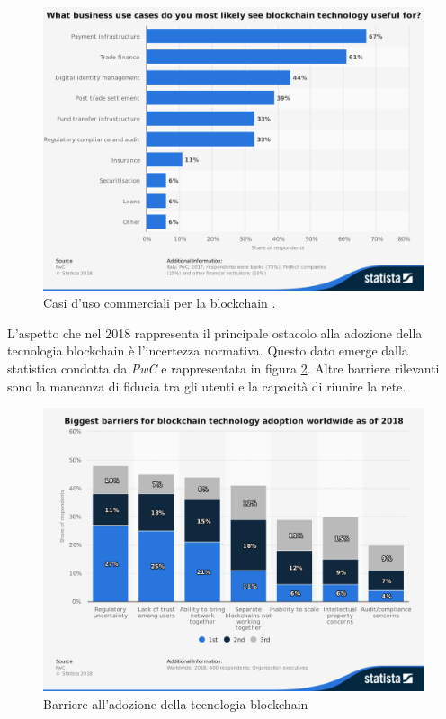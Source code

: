 \begin{figure}[H]
	\centering
	\includegraphics[width=.6\linewidth]{images/chap_intro/use-cases-among-businesses.pdf}
	\caption{Casi d'uso commerciali per la blockchain
		\cite{use-cases-among-businesses}.}
	\label{fig:use-cases-among-businesses}
\end{figure}


L'aspetto che nel 2018 rappresenta il principale ostacolo alla adozione della tecnologia blockchain
è l'incertezza normativa. Questo dato emerge dalla statistica condotta da
\textit{PwC} \cite{barriers-worldwide}
e rappresentata in figura \ref{fig:barriers-worldwide}.
Altre barriere rilevanti sono la mancanza di fiducia tra gli utenti e la capacità di riunire la rete.


\begin{figure}[H]
	\centering
	\includegraphics[width=.6\linewidth]{images/chap_intro/barriers-worldwide.pdf}
	\caption{Barriere all'adozione della tecnologia blockchain
		\cite{barriers-worldwide}}
	\label{fig:barriers-worldwide}
\end{figure}